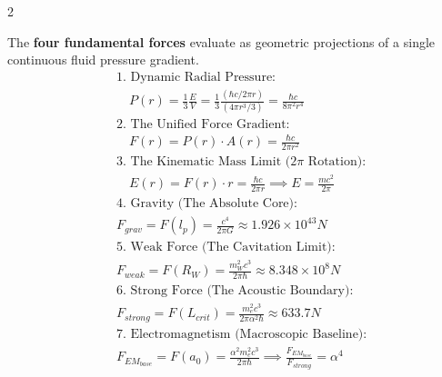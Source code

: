 \documentclass[11pt, a4paper]{article}
\newcounter{cheatnum}
\begin{document}
\begin{multicols}{2}
\begin{tcolorbox}[cheatbox, title={\refstepcounter{cheatnum}\label{box:pressure_gradient}\thecheatnum. Continuous Pressure Dynamics  \scriptsize\hfill\hyperref[sec:deriv_pressure_gradient]{[Proof $\downarrow$]}}]
The \textbf{four fundamental forces} evaluate as geometric projections of a single continuous fluid pressure gradient.
\begin{align}
    &\text{1. Dynamic Radial Pressure:} \nonumber \\
    &\quad P(r) = \frac{1}{3} \frac{E}{V} = \frac{1}{3} \frac{\left(\hbar c / 2\pi r\right)}{\left(4\pi r^3 / 3\right)} = \frac{\hbar c}{8\pi^2 r^4} \label{eq:pressure_thermo} \\
    &\text{2. The Unified Force Gradient:} \nonumber \\
    &\quad F(r) = P(r) \cdot A(r) = \frac{\hbar c}{2\pi r^2} \label{eq:pressure_gradient} \\
    &\text{3. The Kinematic Mass Limit ($2\pi$ Rotation):} \nonumber \\
    &\quad E(r) = F(r) \cdot r = \frac{\hbar c}{2\pi r} \implies E = \frac{mc^2}{2\pi} \label{eq:energy_2pi} \\
    &\text{4. Gravity (The Absolute Core):} \nonumber \\
    &F_{grav} = F(l_p) = \frac{c^4}{2\pi G} \approx 1.926 \times 10^{43} N\label{eq:force_gravity} \\
    &\text{5. Weak Force (The Cavitation Limit):} \nonumber \\
    &F_{weak} = F(R_W) = \frac{m_W^2 c^3}{2\pi \hbar} \approx 8.348 \times 10^8 N\label{eq:force_weak} \\
    &\text{6. Strong Force (The Acoustic Boundary):} \nonumber \\
    &F_{strong} = F(L_{crit}) = \frac{m_e^2 c^3}{2\pi \alpha^2 \hbar} \approx 633.7 N \label{eq:force_strong} \\
    &\text{7. Electromagnetism (Macroscopic Baseline):} \nonumber \\
    &F_{EM_{base}} = F(a_0) = \frac{\alpha^2 m_e^2 c^3}{2\pi \hbar} \implies \frac{F_{EM_{base}}}{F_{strong}} = \alpha^4 \label{eq:force_em_ratio}
\end{align}
\end{tcolorbox}


\end{multicols}
\end{document}
